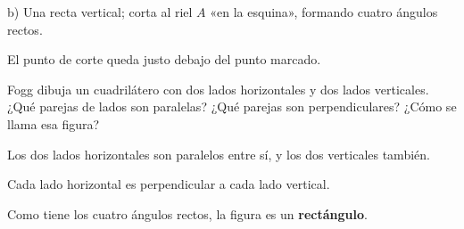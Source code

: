 \documentclass[11pt]{article}
\begin{document}
\begin{preguntas}
\begin{solucion}[5cm]
b) Una recta vertical; corta al riel $A$ «en la esquina», formando cuatro ángulos rectos.

El punto de corte queda justo debajo del punto marcado.
\end{solucion}

\pregunta[1] Fogg dibuja un cuadrilátero con dos lados horizontales y dos lados verticales.
¿Qué parejas de lados son paralelas? ¿Qué parejas son perpendiculares? ¿Cómo se llama esa
figura?
\begin{solucion}[4cm]
Los dos lados horizontales son paralelos entre sí, y los dos verticales también.

Cada lado horizontal es perpendicular a cada lado vertical.

Como tiene los cuatro ángulos rectos, la figura es un \textbf{rectángulo}.
\end{solucion}

\end{preguntas}
\end{document}
